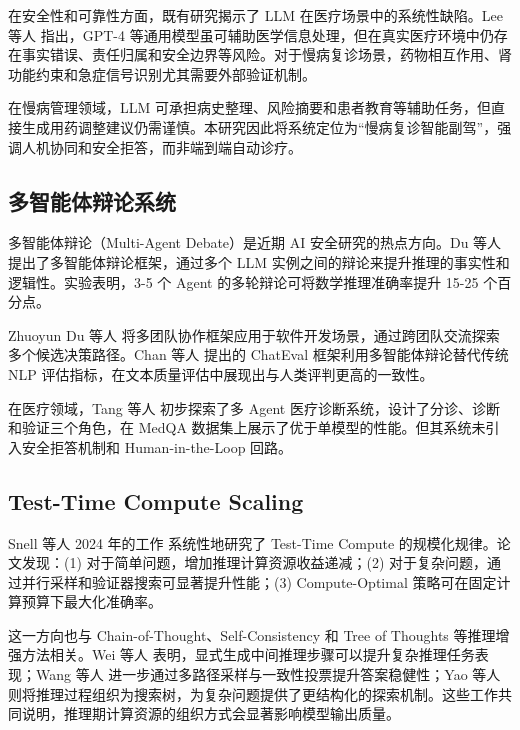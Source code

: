 \documentclass[11pt,a4paper]{ctexart}
\begin{document}
在安全性和可靠性方面，既有研究揭示了 LLM 在医疗场景中的系统性缺陷。Lee 等人 \cite{lee2023benefits} 指出，GPT-4 等通用模型虽可辅助医学信息处理，但在真实医疗环境中仍存在事实错误、责任归属和安全边界等风险。对于慢病复诊场景，药物相互作用、肾功能约束和急症信号识别尤其需要外部验证机制。

在慢病管理领域，LLM 可承担病史整理、风险摘要和患者教育等辅助任务，但直接生成用药调整建议仍需谨慎。本研究因此将系统定位为``慢病复诊智能副驾''，强调人机协同和安全拒答，而非端到端自动诊疗。

\subsection{多智能体辩论系统}

多智能体辩论（Multi-Agent Debate）是近期 AI 安全研究的热点方向。Du 等人 \cite{du2024improving} 提出了多智能体辩论框架，通过多个 LLM 实例之间的辩论来提升推理的事实性和逻辑性。实验表明，3-5 个 Agent 的多轮辩论可将数学推理准确率提升 15-25 个百分点。

Zhuoyun Du 等人 \cite{liang2024multiagent} 将多团队协作框架应用于软件开发场景，通过跨团队交流探索多个候选决策路径。Chan 等人 \cite{chan2024chateval} 提出的 ChatEval 框架利用多智能体辩论替代传统 NLP 评估指标，在文本质量评估中展现出与人类评判更高的一致性。

在医疗领域，Tang 等人 \cite{tang2024medagents} 初步探索了多 Agent 医疗诊断系统，设计了分诊、诊断和验证三个角色，在 MedQA 数据集上展示了优于单模型的性能。但其系统未引入安全拒答机制和 Human-in-the-Loop 回路。

\subsection{Test-Time Compute Scaling}

Snell 等人 2024 年的工作 \cite{snell2024scaling} 系统性地研究了 Test-Time Compute 的规模化规律。论文发现：(1) 对于简单问题，增加推理计算资源收益递减；(2) 对于复杂问题，通过并行采样和验证器搜索可显著提升性能；(3) Compute-Optimal 策略可在固定计算预算下最大化准确率。

这一方向也与 Chain-of-Thought、Self-Consistency 和 Tree of Thoughts 等推理增强方法相关。Wei 等人 \cite{wei2022chain} 表明，显式生成中间推理步骤可以提升复杂推理任务表现；Wang 等人 \cite{wang2023self} 进一步通过多路径采样与一致性投票提升答案稳健性；Yao 等人 \cite{yao2024tree} 则将推理过程组织为搜索树，为复杂问题提供了更结构化的探索机制。这些工作共同说明，推理期计算资源的组织方式会显著影响模型输出质量。
\end{document}
